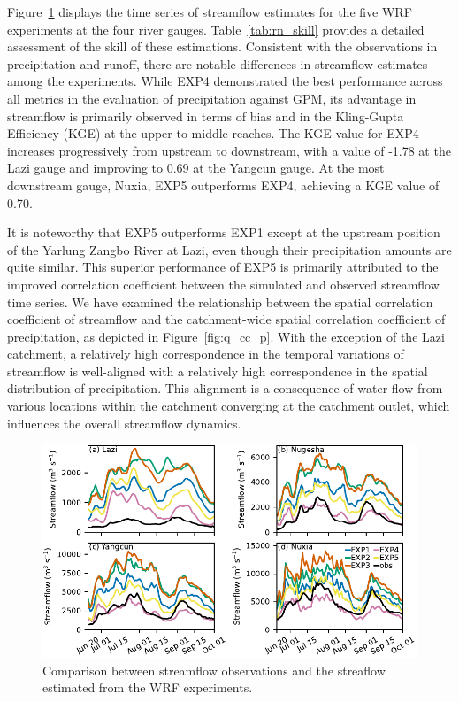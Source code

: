 \documentclass[draft]{agujournal2019}
\begin{document}
Figure~\ref{fig:q_opt} displays the time series of streamflow estimates for the five WRF experiments at the four river gauges. Table~\ref{tab:rn_skill} provides a detailed assessment of the skill of these estimations. Consistent with the observations in precipitation and runoff, there are notable differences in streamflow estimates among the experiments. While EXP4 demonstrated the best performance across all metrics in the evaluation of precipitation against GPM, its advantage in streamflow is primarily observed in terms of bias and in the Kling-Gupta Efficiency (KGE) at the upper to middle reaches. The KGE value for EXP4 increases progressively from upstream to downstream, with a value of -1.78 at the Lazi gauge and improving to 0.69 at the Yangcun gauge. At the most downstream gauge, Nuxia, EXP5 outperforms EXP4, achieving a KGE value of 0.70.

It is noteworthy that EXP5 outperforms EXP1 except at the upstream position of the Yarlung Zangbo River at Lazi, even though their precipitation amounts are quite similar. This superior performance of EXP5 is primarily attributed to the improved correlation coefficient between the simulated and observed streamflow time series. We have examined the relationship between the spatial correlation coefficient of streamflow and the catchment-wide spatial correlation coefficient of precipitation, as depicted in Figure~\ref{fig:q_cc_p}. With the exception of the Lazi catchment, a relatively high correspondence in the temporal variations of streamflow is well-aligned with a relatively high correspondence in the spatial distribution of precipitation. This alignment is a consequence of water flow from various locations within the catchment converging at the catchment outlet, which influences the overall streamflow dynamics.

\begin{figure}[h!]
  \centering
  \noindent\includegraphics[width=140mm]{q_opt.pdf}
  \caption{Comparison between streamflow observations and the streaflow estimated from the WRF experiments. \label{fig:q_opt}}
\end{figure}
\end{document}
